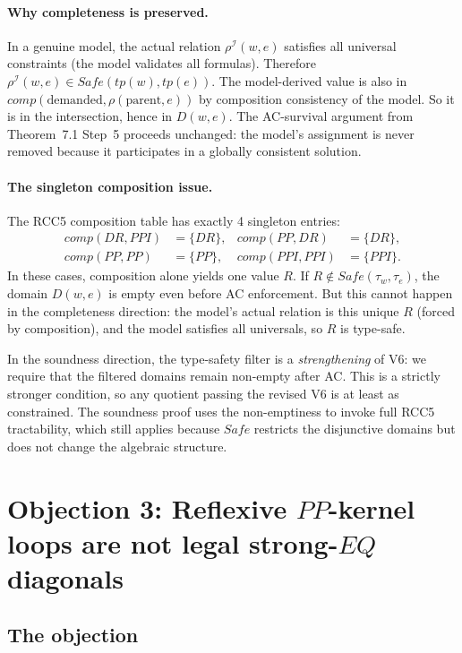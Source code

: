 \documentclass[11pt]{article}
\newcommand{\interp}{\mathcal{I}}
\newcommand{\DR}{\mathit{DR}}
\newcommand{\PP}{\mathit{PP}}
\newcommand{\PPI}{\mathit{PPI}}
\newcommand{\EQ}{\mathit{EQ}}
\newcommand{\comp}{\mathit{comp}}
\newcommand{\tp}{\mathit{tp}}
\begin{document}
\paragraph{Why completeness is preserved.}
In a genuine model, the actual relation $\rho^\interp(w, e)$ satisfies
all universal constraints (the model validates all formulas).  Therefore
$\rho^\interp(w, e) \in \mathit{Safe}(\tp(w), \tp(e))$.  The
model-derived value is also in $\comp(\text{demanded},
\rho(\text{parent}, e))$ by composition consistency of the model.
So it is in the intersection, hence in $D(w,e)$.  The AC-survival
argument from Theorem~7.1 Step~5 proceeds unchanged: the model's
assignment is never removed because it participates in a globally
consistent solution.

\paragraph{The singleton composition issue.}
The RCC5 composition table has exactly 4 singleton entries:
\begin{align*}
\comp(\DR, \PPI) &= \{\DR\}, &
\comp(\PP, \DR) &= \{\DR\}, \\
\comp(\PP, \PP) &= \{\PP\}, &
\comp(\PPI, \PPI) &= \{\PPI\}.
\end{align*}
In these cases, composition alone yields one value $R$.  If $R \notin
\mathit{Safe}(\tau_w, \tau_e)$, the domain $D(w,e)$ is empty even before
AC enforcement.  But this cannot happen in the completeness direction:
the model's actual relation is this unique $R$ (forced by composition),
and the model satisfies all universals, so $R$ is type-safe.

In the soundness direction, the type-safety filter is a
\emph{strengthening} of V6: we require that the filtered domains remain
non-empty after AC.  This is a strictly stronger condition, so any
quotient passing the revised V6 is at least as constrained.  The
soundness proof uses the non-emptiness to invoke full RCC5 tractability,
which still applies because $\mathit{Safe}$ restricts the disjunctive
domains but does not change the algebraic structure.

\section{Objection 3: Reflexive $\PP$-kernel loops are not legal strong-$\EQ$ diagonals}

\subsection{The objection}
\end{document}
